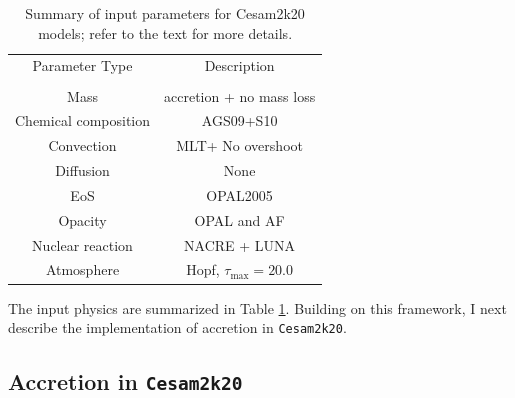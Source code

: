 \documentclass[12pt,a4paper]{article}
\newenvironment{outline}[1]{%
  \begin{itemize}[label=\textbullet]%
  \color{#1}%
}{%
  \end{itemize}%
}
\begin{document}
\begin{table}
    \hfill
    \begin{tabularx}{.8\textwidth}{|| c | c ||}
        \cline{1-2}
        Parameter Type & Description \\ \cline{1-2}\\[-1em]\cline{1-2}
        Mass & accretion + no mass loss\\ \cline{1-2}
        Chemical composition  & AGS09+S10\footnotemark[1]\\ \cline{1-2}
        Convection & MLT\footnotemark[2] + No overshoot\\ \cline{1-2}
        Diffusion & None \\ \cline{1-2}
        EoS & OPAL2005\footnotemark[3] \\ \cline{1-2}
        Opacity & OPAL and AF \footnotemark[4]\\ \cline{1-2}
        Nuclear reaction & NACRE + LUNA\footnotemark[5]\\ \cline{1-2}
        Atmosphere & Hopf\footnotemark[6], $\tau_{\max} = 20.0$\\ \cline{1-2}
    \end{tabularx}
    \caption{Summary of input parameters for Cesam2k20 models; refer to the text for more details.} \label{tab:input_physics}
    \hfill
\end{table}

The input physics are summarized in Table \ref{tab:input_physics}. Building on this framework, I next describe the implementation of accretion in \texttt{Cesam2k20}.

\subsection{Accretion in \texttt{Cesam2k20}}
\label{sec:accretion_cesam2k20}

\end{document}
